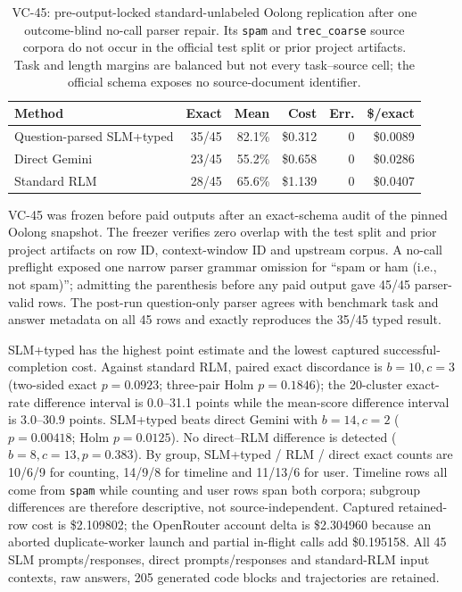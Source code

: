 \documentclass[letterpaper]{article}
\begin{document}
\begin{table}[!t]
\centering
\small
\setlength{\tabcolsep}{3pt}
\begin{tabular}{@{}lrrrrr@{}}
\toprule
\textbf{Method} & \textbf{Exact} & \textbf{Mean} & \textbf{Cost} & \textbf{Err.} & \textbf{\$/exact} \\
\midrule
Question-parsed SLM+typed & 35/45 & 82.1\% & \$0.312 & 0 & \$0.0089 \\
Direct Gemini & 23/45 & 55.2\% & \$0.658 & 0 & \$0.0286 \\
Standard RLM & 28/45 & 65.6\% & \$1.139 & 0 & \$0.0407 \\
\bottomrule
\end{tabular}
\caption{VC-45: pre-output-locked standard-unlabeled Oolong replication after one outcome-blind no-call parser repair. Its \texttt{spam} and \texttt{trec\_coarse} source corpora do not occur in the official test split or prior project artifacts. Task and length margins are balanced but not every task--source cell; the official schema exposes no source-document identifier.}
\label{tab:supp-oolong-validation-corpus-disjoint-n45}
\end{table}

VC-45 was frozen before paid outputs after an exact-schema audit of the pinned Oolong snapshot. The freezer verifies zero overlap with the test split and prior project artifacts on row ID, context-window ID and upstream corpus. A no-call preflight exposed one narrow parser grammar omission for ``spam or ham (i.e., not spam)''; admitting the parenthesis before any paid output gave 45/45 parser-valid rows. The post-run question-only parser agrees with benchmark task and answer metadata on all 45 rows and exactly reproduces the 35/45 typed result.

SLM+typed has the highest point estimate and the lowest captured successful-completion cost. Against standard RLM, paired exact discordance is $b=10,c=3$ (two-sided exact $p=0.0923$; three-pair Holm $p=0.1846$); the 20-cluster exact-rate difference interval is 0.0--31.1 points while the mean-score difference interval is 3.0--30.9 points. SLM+typed beats direct Gemini with $b=14,c=2$ ($p=0.00418$; Holm $p=0.0125$). No direct--RLM difference is detected ($b=8,c=13,p=0.383$). By group, SLM+typed / RLM / direct exact counts are 10/6/9 for counting, 14/9/8 for timeline and 11/13/6 for user. Timeline rows all come from \texttt{spam} while counting and user rows span both corpora; subgroup differences are therefore descriptive, not source-independent. Captured retained-row cost is \$2.109802; the OpenRouter account delta is \$2.304960 because an aborted duplicate-worker launch and partial in-flight calls add \$0.195158. All 45 SLM prompts/responses, direct prompts/responses and standard-RLM input contexts, raw answers, 205 generated code blocks and trajectories are retained.
\end{document}
